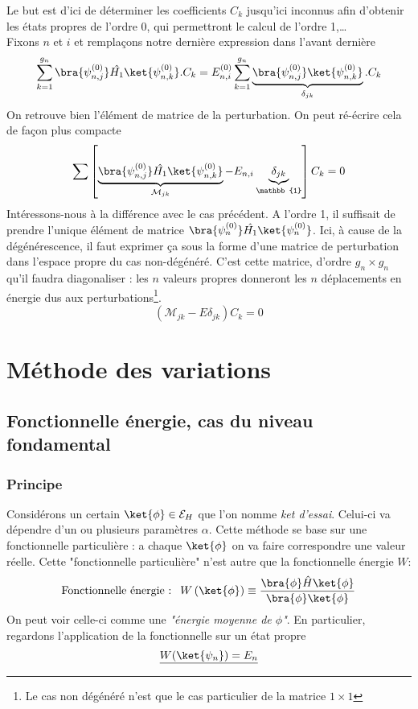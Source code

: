 	Le but est d'ici de déterminer les coefficients $C_k$ jusqu'ici inconnus afin d'obtenir 
	les états propres de l'ordre 0, qui permettront le calcul	de l'ordre 1,\dots \\
	Fixons $n$ et $i$ et remplaçons notre dernière expression dans l'avant dernière
	\begin{equation}
	\sum_{k=1}^{g_n} \bra{\psi_{n,j}^{(0)}}\hat{H_1}\ket{\psi_{n,k}^{(0)}}.C_k = E_{n,i}^{(0)}
	\sum_{k=1}^{g_n} \underbrace{\bra{\psi_{n,j}^{(0)}}\ket{\psi_{n,k}^{(0)}}}_{\delta_{jk}}.C_k
	\end{equation}
	On retrouve bien l'élément de matrice de la perturbation. On peut ré-écrire cela de façon 
	plus compacte
	\begin{equation}
	\sum\left[\underbrace{\bra{\psi_{n,j}^{(0)}}\hat{H_1}\ket{\psi_{n,k}^{(0)}}}_{\mathcal{M}_{jk}}-
	E_{n,i}\underbrace{\delta_{jk}}_{\mathbb{1}}\right]C_k=0	
	\end{equation}	
	Intéressons-nous à la différence avec le cas précédent. A l'ordre 1, il suffisait de prendre 
	l'unique élément de matrice $\bra{\psi_n^{(0)}}\hat{H_1}\ket{\psi_n^{(0)}}$. Ici, à cause 
	de la dégénérescence, il faut exprimer ça sous la forme d'une matrice de perturbation dans 
	l'espace propre du cas non-dégénéré. C'est cette matrice, d'ordre $g_n\times g_n$ qu'il 
	faudra diagonaliser : les $n$ valeurs propres donneront les $n$ déplacements en énergie 
	dus aux perturbations\footnote{Le cas non dégénéré n'est que le cas particulier de la 
	matrice $1\times1$}.
	\begin{equation}
	(\mathcal{M}_{jk}-E\delta_{jk})C_k=0
	\end{equation}
	
	
	

\section{Méthode des variations}
	\subsection{Fonctionnelle énergie, cas du niveau fondamental}	
		\subsubsection{Principe}
		Considérons un certain $\ket{\phi}\in\mathcal{E}_H$ que l'on nomme 
		\textit{ket d'essai}. Celui-ci va dépendre d'un ou plusieurs paramètres $\alpha$. 
		Cette méthode se base sur une fonctionnelle particulière : a chaque $\ket{\phi}$ on va 
		faire correspondre une 	valeur réelle. Cette "fonctionnelle particulière" n'est autre 
		que la fonctionnelle énergie $W$:
		\begin{equation}
		\text{Fonctionnelle énergie : }\ W\left(\ket{\phi}\right) \equiv \dfrac{\bra{\phi}\hat{H}\ket{\phi}}{
		\bra{\phi}\ket{\phi}}
		\end{equation}
		On peut voir celle-ci comme une \textit{"énergie moyenne de $\phi$"}. En particulier, 
		regardons l'application de la fonctionnelle sur un état propre
		\begin{equation}
		\underline{W(\ket{\psi_n}) = E_n}
		\end{equation}
		
